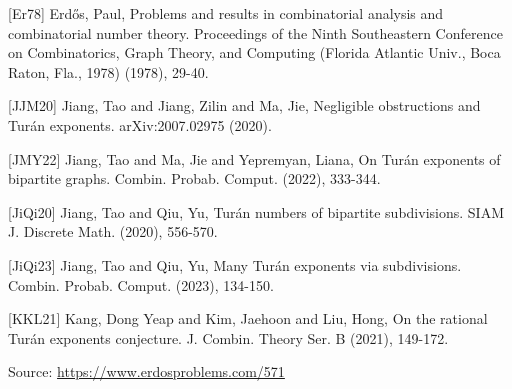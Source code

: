 \documentclass{article}
\begin{document}
 [Er78] Erd\H{o}s, Paul, Problems and results in combinatorial analysis and combinatorial number theory. Proceedings of the Ninth Southeastern Conference on Combinatorics, Graph Theory, and Computing (Florida Atlantic Univ., Boca Raton, Fla., 1978) (1978), 29-40.
 
 [JJM20] Jiang, Tao and Jiang, Zilin and Ma, Jie, Negligible obstructions and Tur\'{a}n exponents. arXiv:2007.02975 (2020).
 
 [JMY22] Jiang, Tao and Ma, Jie and Yepremyan, Liana, On Tur\'{a}n exponents of bipartite graphs. Combin. Probab. Comput. (2022), 333-344.
 
 [JiQi20] Jiang, Tao and Qiu, Yu, Tur\'{a}n numbers of bipartite subdivisions. SIAM J. Discrete Math. (2020), 556-570.
 
 [JiQi23] Jiang, Tao and Qiu, Yu, Many Tur\'{a}n exponents via subdivisions. Combin. Probab. Comput. (2023), 134-150.
 
 [KKL21] Kang, Dong Yeap and Kim, Jaehoon and Liu, Hong, On the rational Tur\'{a}n exponents conjecture. J. Combin. Theory Ser. B (2021), 149-172.

\bigskip
\noindent\small{Source: \url{https://www.erdosproblems.com/571}}
\end{document}
